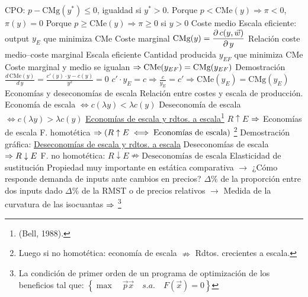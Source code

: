 \documentclass{nuevotema}
\begin{document}
\begin{esquemal}
				\4[] CPO: $p-\text{CMg}(y^*) \leq 0$, igualdad si $y^* > 0$.
				\4[$\Rightarrow$] 
				\4[] Porque $p < \text{CMe}(y) \Rightarrow \pi < 0$, $\pi (y) =0$
				\4[$\Rightarrow$] 
				\4[] Porque $p \geq \text{CMe}(y) \Rightarrow \pi \geq 0$ si $y>0$
				\4[] 
			\3 Coste medio
				\4 
				\4 Escala eficiente: output $y_E$ que minimiza CMe
			\3 Coste marginal
				\4 $ \text{CMg}(y) = \dfrac{\partial \, c(y, \vec{w})}{\partial \, y}$
			\3 Relación coste medio--coste marginal
				\4 Escala eficiente
				\4[] Cantidad producida $y_{EF}$ que minimiza $\text{CMe}$
				\4 Coste marginal y medio se igualan
				\4[] $\Rightarrow \text{CMe} (y_{EF}) = \text{CMg} (y_{EF}) $
				\4 Demostración
				\4[] $ \frac{d \, \text{CMe} (y)}{d \, y} = \frac{c'(y) \cdot y - c(y)}{y^2}=0 $
				\4[] $ c' \cdot y_E = c \Rightarrow \frac{c}{y_E} = c' \Rightarrow \text{CMe}(y_E) = \text{CMg}(y_E) $
			\3 Economías y deseconomías de escala
				\4 Relación entre costes y escala de producción.
				\4[] Economía de escala $\iff c(\lambda y) < \lambda c(y)$
				\4[] Deseconomía de escala $\iff c(\lambda y) > \lambda c(y)$
				\4 \underline{Economías de escala y rdtos. a escala}\footnote{(Bell, 1988).}
				\4[] $R \uparrow E$ $\Rightarrow$ Economías de escala
				\4[] F. homotética $\Rightarrow \left( R \uparrow E \iff \text{Economías de escala} \right) $ \footnote{Luego si no homotética: economía de escala $\nRightarrow$ Rdtos. crecientes a escala.}
				\4[] Demostración gráfica:
				\4[] 
				\4 \underline{Deseconomías de escala y rdtos. a escala}
				\4[] Deseconomías de escala $\Rightarrow R \downarrow E$
				\4[] F. no homotética: $ R \downarrow E \nRightarrow \text{Deseconomías de escala}$
			\3 Elasticidad de sustitución
				\4 Propiedad muy importante en estática comparativa
				\4[] $\to$ ¿Cómo responde demanda de inputs ante cambios en precios?
				\4 $\varDelta \%$ de la proporción entre dos inputs
				\4[] dado $\varDelta \%$ de la RMST o de precios relativos
				\4[] $\to$ Medida de la curvatura de las isocuantas
				\4[] $\Rightarrow$ \footnote{ La condición de primer orden de un programa de optimización de los beneficios tal que: $\left\lbrace \max \quad  \vec{p} \vec{x} \quad s.a. \quad F(\vec{x}) = 0 \right\rbrace$
}
\end{esquemal}
\end{document}
